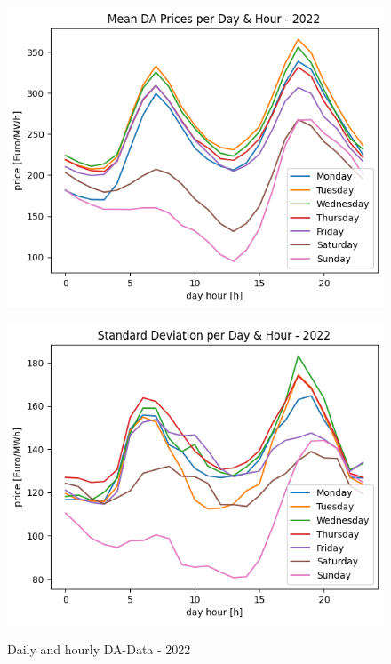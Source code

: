 \begin{figure}[h!]
	\centering
	\begin{minipage}{0.49\textwidth}
		\includegraphics[width=1\linewidth]{pictures/DA/Mean DA Prices per Day and Hour - 2022.png}
		\label{fig:meanDA2022}
	\end{minipage} \hfill
	\begin{minipage}{0.49\textwidth}
		\includegraphics[width=1\linewidth]{pictures/DA/Standard Deviation per Day and Hour - 2022.png}
		\label{fig:stdDA2022}
	\end{minipage}
	\caption{Daily and hourly DA-Data - 2022 }
\end{figure}

